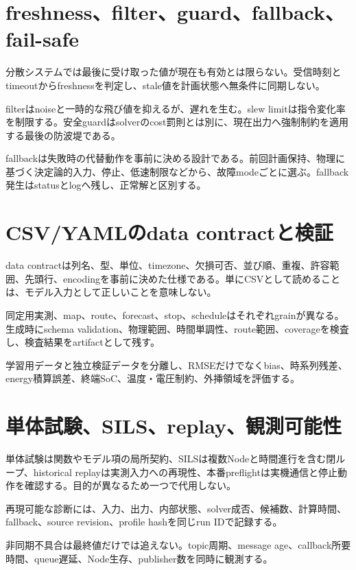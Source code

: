 \documentclass[a4paper,11pt]{article}
\begin{document}
\section{freshness、filter、guard、fallback、fail-safe}
分散システムでは最後に受け取った値が現在も有効とは限らない。受信時刻とtimeoutからfreshnessを判定し、stale値を計画状態へ無条件に同期しない。


filterはnoiseと一時的な飛び値を抑えるが、遅れを生む。slew limitは指令変化率を制限する。安全guardはsolverのcost罰則とは別に、現在出力へ強制制約を適用する最後の防波堤である。


fallbackは失敗時の代替動作を事前に決める設計である。前回計画保持、物理に基づく決定論的入力、停止、低速制限などから、故障modeごとに選ぶ。fallback発生はstatusとlogへ残し、正常解と区別する。



\section{CSV/YAMLのdata contractと検証}
data contractは列名、型、単位、timezone、欠損可否、並び順、重複、許容範囲、先頭行、encodingを事前に決めた仕様である。単にCSVとして読めることは、モデル入力として正しいことを意味しない。


同定用実測、map、route、forecast、stop、scheduleはそれぞれgrainが異なる。生成時にschema validation、物理範囲、時間単調性、route範囲、coverageを検査し、検査結果をartifactとして残す。


学習用データと独立検証データを分離し、RMSEだけでなくbias、時系列残差、energy積算誤差、終端SoC、温度・電圧制約、外挿領域を評価する。



\section{単体試験、SILS、replay、観測可能性}
単体試験は関数やモデル項の局所契約、SILSは複数Nodeと時間進行を含む閉ループ、historical replayは実測入力への再現性、本番preflightは実機通信と停止動作を確認する。目的が異なるため一つで代用しない。


再現可能な診断には、入力、出力、内部状態、solver成否、候補数、計算時間、fallback、source revision、profile hashを同じrun IDで記録する。


非同期不具合は最終値だけでは追えない。topic周期、message age、callback所要時間、queue遅延、Node生存、publisher数を同時に観測する。
\end{document}
